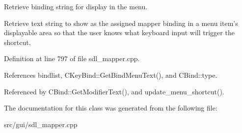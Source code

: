 Retrieve binding string for display in the menu. 

Retrieve text string to show as the assigned mapper binding in a menu item's displayable area so that the user knows what keyboard input will trigger the shortcut. 

Definition at line 797 of file sdl\-\_\-mapper.\-cpp.



References bindlist, C\-Key\-Bind\-::\-Get\-Bind\-Menu\-Text(), and C\-Bind\-::type.



Referenced by C\-Bind\-::\-Get\-Modifier\-Text(), and update\-\_\-menu\-\_\-shortcut().



The documentation for this class was generated from the following file\-:\begin{DoxyCompactItemize}
\item 
src/gui/sdl\-\_\-mapper.\-cpp\end{DoxyCompactItemize}
